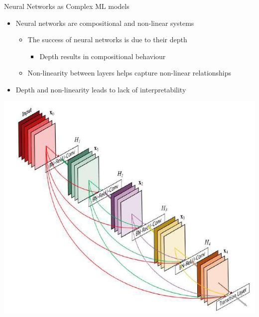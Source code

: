 \documentclass[aspectratio=169]{../latex_main/tntbeamer}
\begin{document}
\begin{frame}{Neural Networks as Complex ML models}
	\begin{itemize}
		\item Neural networks are compositional and non-linear systems
		\begin{itemize}
			\item The success of neural networks is due to their depth
			\begin{itemize}
				\item Depth results in compositional behaviour
			\end{itemize}
			\item Non-linearity between layers helps capture non-linear relationships
		\end{itemize}
		\bigskip
		
		\item Depth and non-linearity leads to lack of interpretability
	\end{itemize}

    \hfill
    \includegraphics[scale=.4]{img116}

\end{frame}
\end{document}

